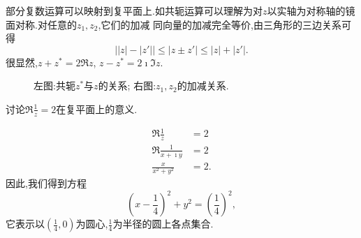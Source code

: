 部分复数运算可以映射到复平面上.如共轭运算可以理解为对$z$以实轴为对称轴的镜面对称.对任意的$z_1,z_2$,它们的加减
同向量的加减完全等价,由三角形的三边关系可得
\begin{equation}
    \left| |z|- |z'| \right| \leq |z \pm z'| \leq |z| + |z'| .
\end{equation}
很显然,$z+z^{*} = 2 \Re z$, $z-z^{*} = 2\imath \Im z$.
\begin{figure}
    \centering
    
\quad 
        
        \caption{左图:共轭$z^{*}$与$z$的关系; 右图:$z_1, z_2$的加减关系.}
    \end{figure}
\begin{example}
讨论$\Re \frac{1}{z} = 2$在复平面上的意义.
\end{example}
\begin{solution}
    \begin{align*}
        \Re \frac{1}{z} &= 2\\
        \Re \frac{1}{x+\imath y} &  = 2 \\
        \frac{x}{x^2 +y^2} & = 2 .
    \end{align*}
因此,我们得到方程
\[
    (x-\frac{1}{4})^2 + y^2 = \left( \frac{1}{4}\right)^2,
\]
它表示以$(\frac{1}{4},0)$为圆心,$\frac{1}{4}$为半径的圆上各点集合.
\end{solution}
        


